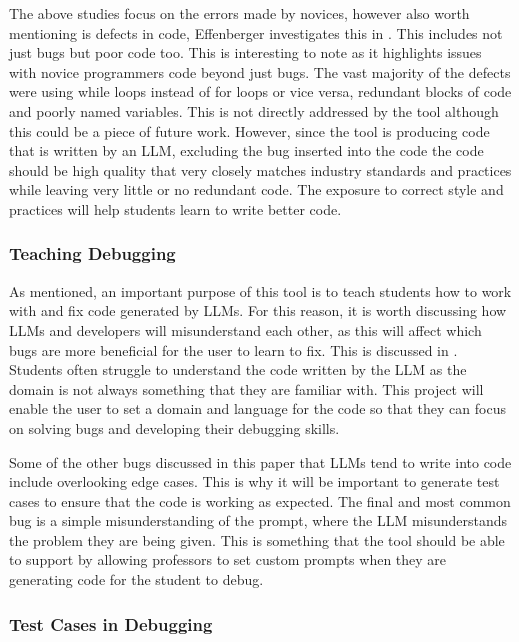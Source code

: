 \documentclass[12pt]{extarticle}
\begin{document}
The above studies focus on the errors made by novices, however also worth mentioning is defects in code, Effenberger investigates this in \cite{Effenberger2022}. This includes not just bugs but poor code too. This is interesting to note as it highlights issues with novice programmers code beyond just bugs. The vast majority of the defects were using while loops instead of for loops or vice versa, redundant blocks of code and poorly named variables. This is not directly addressed by the tool although this could be a piece of future work. However, since the tool is producing code that is written by an LLM, excluding the bug inserted into the code the code should be high quality that very closely matches industry standards and practices while leaving very little or no redundant code. The exposure to correct style and practices will help students learn to write better code.

\subsubsection{Teaching Debugging}

As mentioned, an important purpose of this tool is to teach students how to work with and fix code generated by LLMs. For this reason, it is worth discussing how LLMs and developers will misunderstand each other, as this will affect which bugs are more beneficial for the user to learn to fix. This is discussed in \cite{nguyen2024}. Students often struggle to understand the code written by the LLM as the domain is not always something that they are familiar with. This project will enable the user to set a domain and language for the code so that they can focus on solving bugs and developing their debugging skills. 

Some of the other bugs discussed in this paper that LLMs tend to write into code include overlooking edge cases. This is why it will be important to generate test cases to ensure that the code is working as expected. The final and most common bug is a simple misunderstanding of the prompt, where the LLM misunderstands the problem they are being given. This is something that the tool should be able to support by allowing professors to set custom prompts when they are generating code for the student to debug.

\subsubsection{Test Cases in Debugging}
\end{document}
